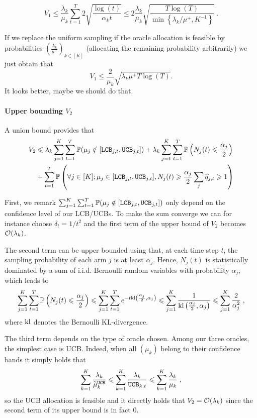 \[V_1 \leq \frac{\lambda_k}{\mu_k} \sum_{t=1}^T 2 \sqrt{\frac{\log(t)}{\alpha_k t}} \leq 2\frac{\lambda_k}{\mu_k}\sqrt{\frac{T\log(T)}{\min\left\{\lambda_k/\mu^+, K^{-1} \right\}}}\;. \] %

\begin{remark}
	If we replace the uniform sampling if the oracle allocation is feasible by probabilities $\left(\frac{\lambda_k}{\mu^+}\right)_{k \in [K]}$ (allocating the remaining probability arbitrarily) we just obtain that \[V_1 \leq \frac{2}{\mu_k}\sqrt{\lambda_k \mu^+ T \log(T)}.\] It looks better, maybe we should do that.
\end{remark}

\paragraph{Upper bounding $V_2$} A union bound provides that 
\begin{align*}
V_2 & \leqslant \lambda_k \sum_{j=1}^K \sum_{t=1}^T \mathbb{P}(\mu_j \notin [\texttt{LCB}_{j, t}, \texttt{UCB}_{j, t}])  + \lambda_k \sum_{j=1}^K \sum_{t=1}^T\mathbb{P}\left(N_j(t)\leqslant \frac{\alpha_j}{2}\right) \\
&+ \sum_{t=1}^T \mathbb{P}\left(\forall j \in [K]; \mu_j \in [\texttt{LCB}_{j, t}, \texttt{UCB}_{j, t}], N_j(t)\geqslant \frac{\alpha_j}{2} \sum_j \widehat{q}_{j,t} \geqslant 1\right) 
\end{align*}
 
First, we remark $\sum_{j=1}^K \sum_{t=1}^T \mathbb{P}(\mu_j \notin [\texttt{LCB}_{j, t}, \texttt{UCB}_{j, t}])$ only depend on the confidence level of our LCB/UCBs. To make the sum converge we can for instance choose $\delta_t = 1/t^2$ and the first term of the upper bound of $V_2$ becomes $\mathcal{O}(\lambda_k)$. 

The second term can be upper bounded using that, at each time step $t$, the sampling probability of each arm $j$ is at least $\alpha_j$. Hence, $N_j(t)$ is statistically dominated by a sum of i.i.d. Bernoulli random variables with probability $\alpha_j$, which leads to 
\begin{align*}
\sum_{j=1}^K \sum_{t=1}^T\mathbb{P}\left(N_j(t)\leqslant \frac{\alpha_j}{2}\right) \leqslant \sum_{j=1}^K \sum_{t=1}^T e^{-t \text{\normalfont kl}\left(\frac{\alpha_j}{2}, \alpha_j\right)} \leqslant  \sum_{j=1}^K   \frac{1}{\text{\normalfont kl}\left(\frac{\alpha_j}{2}, \alpha_j\right)} \leqslant \sum_{j=1}^K\frac{2}{\alpha_j^2}\;,
\end{align*}
where $\text{\normalfont kl}$ denotes the Bernoulli KL-divergence.

The third term depends on the type of oracle chosen. Among our three oracles, the simplest case is UCB. Indeed, when all $(\mu_k)$ belong to their confidence bands it simply holds that  \[\sum_{k=1}^K \frac{\lambda_k}{\widetilde{\mu}_k^{\texttt{UCB}}} \leqslant \sum_{k=1}^K \frac{\lambda_k}{ \texttt{UCB}_{k,t}} \leqslant \sum_{k=1}^K \frac{\lambda_k}{ \mu_k}\;,\] so the UCB allocation is feasible and it directly holds that $V_2=\mathcal{O}(\lambda_k)$ since the second term of its upper bound is in fact $0$.

